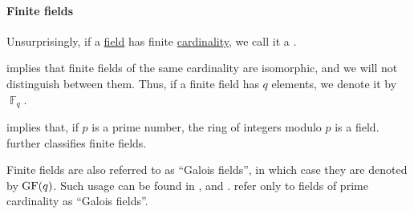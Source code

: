 \paragraph{Finite fields}

\begin{definition}\label{def:finite_field}\mimprovised
  Unsurprisingly, if a \hyperref[def:field]{field} has finite \hyperref[thm:cardinality_existence]{cardinality}, we call it a .

   implies that finite fields of the same cardinality are isomorphic, and we will not distinguish between them. Thus, if a finite field has \( q \) elements, we denote it by \( \BbbF_q \).
\end{definition}
\begin{comments}
  \item {} implies that, if \( p \) is a prime number, the ring of integers modulo \( p \) is a field.  further classifies finite fields.

  \item Finite fields are also referred to as \enquote{Galois fields}, in which case they are denoted by \( \op{GF}(q) \). Such usage can be found in ,  and .  refer only to fields of prime cardinality as \enquote{Galois fields}.
\end{comments}

